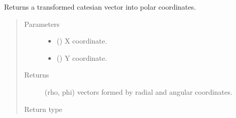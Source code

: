 \documentclass[a4paper,10pt,english]{sphinxmanual}
\begin{document}

\begin{fulllineitems}
\label{\detokenize{autodoc/mrsprint/mrsprint.simulator:mrsprint.simulator.transform_cart_to_pol}}
Returns a transformed catesian vector into polar coordinates.
\begin{quote}\begin{description}
\item[{Parameters}] \leavevmode\begin{itemize}
\item {} 
 () \textendash{} X coordinate.

\item {} 
 () \textendash{} Y coordinate.

\end{itemize}

\item[{Returns}] \leavevmode
(rho, phi) vectors formed by radial and angular coordinates.

\item[{Return type}] \leavevmode
{}

\end{description}\end{quote}

\end{fulllineitems}

\end{document}
